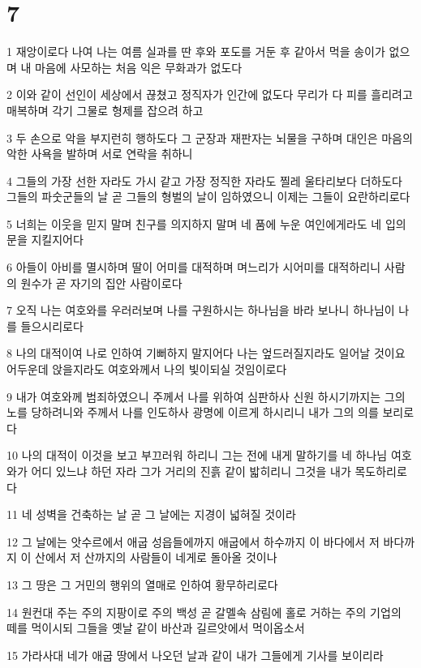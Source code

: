 \chapter{7}

\par 1 재앙이로다 나여 나는 여름 실과를 딴 후와 포도를 거둔 후 같아서 먹을 송이가 없으며 내 마음에 사모하는 처음 익은 무화과가 없도다
\par 2 이와 같이 선인이 세상에서 끊쳤고 정직자가 인간에 없도다 무리가 다 피를 흘리려고 매복하며 각기 그물로 형제를 잡으려 하고
\par 3 두 손으로 악을 부지런히 행하도다 그 군장과 재판자는 뇌물을 구하며 대인은 마음의 악한 사욕을 발하며 서로 연락을 취하니
\par 4 그들의 가장 선한 자라도 가시 같고 가장 정직한 자라도 찔레 울타리보다 더하도다 그들의 파숫군들의 날 곧 그들의 형벌의 날이 임하였으니 이제는 그들이 요란하리로다
\par 5 너희는 이웃을 믿지 말며 친구를 의지하지 말며 네 품에 누운 여인에게라도 네 입의 문을 지킬지어다
\par 6 아들이 아비를 멸시하며 딸이 어미를 대적하며 며느리가 시어미를 대적하리니 사람의 원수가 곧 자기의 집안 사람이로다
\par 7 오직 나는 여호와를 우러러보며 나를 구원하시는 하나님을 바라 보나니 하나님이 나를 들으시리로다
\par 8 나의 대적이여 나로 인하여 기뻐하지 말지어다 나는 엎드러질지라도 일어날 것이요 어두운데 앉을지라도 여호와께서 나의 빛이되실 것임이로다
\par 9 내가 여호와께 범죄하였으니 주께서 나를 위하여 심판하사 신원 하시기까지는 그의 노를 당하려니와 주께서 나를 인도하사 광명에 이르게 하시리니 내가 그의 의를 보리로다
\par 10 나의 대적이 이것을 보고 부끄러워 하리니 그는 전에 내게 말하기를 네 하나님 여호와가 어디 있느냐 하던 자라 그가 거리의 진흙 같이 밟히리니 그것을 내가 목도하리로다
\par 11 네 성벽을 건축하는 날 곧 그 날에는 지경이 넓혀질 것이라
\par 12 그 날에는 앗수르에서 애굽 성읍들에까지 애굽에서 하수까지 이 바다에서 저 바다까지 이 산에서 저 산까지의 사람들이 네게로 돌아올 것이나
\par 13 그 땅은 그 거민의 행위의 열매로 인하여 황무하리로다
\par 14 원컨대 주는 주의 지팡이로 주의 백성 곧 갈멜속 삼림에 홀로 거하는 주의 기업의 떼를 먹이시되 그들을 옛날 같이 바산과 길르앗에서 먹이옵소서
\par 15 가라사대 네가 애굽 땅에서 나오던 날과 같이 내가 그들에게 기사를 보이리라
